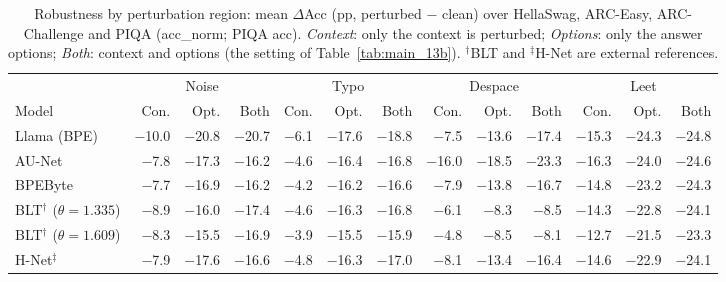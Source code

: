 \begin{table}[t]
\centering
\small
\caption{Robustness by perturbation region: mean $\Delta$Acc (pp, perturbed $-$ clean) over HellaSwag, ARC-Easy, ARC-Challenge and PIQA (acc\_norm; PIQA acc). \textit{Context}: only the context is perturbed; \textit{Options}: only the answer options; \textit{Both}: context and options (the setting of Table~\ref{tab:main_13b}). $^{\dagger}$BLT and $^{\ddagger}$H-Net are external references.}
\label{tab:robust_region}
\begin{tabular}{l|rrr|rrr|rrr|rrr}
\toprule
 & \multicolumn{3}{c}{Noise} & \multicolumn{3}{c}{Typo} & \multicolumn{3}{c}{Despace} & \multicolumn{3}{c}{Leet} \\
Model & Con. & Opt. & Both & Con. & Opt. & Both & Con. & Opt. & Both & Con. & Opt. & Both \\
\midrule
Llama (BPE) & $-$10.0 & $-$20.8 & $-$20.7 & $-$6.1 & $-$17.6 & $-$18.8 & $-$7.5 & $-$13.6 & $-$17.4 & $-$15.3 & $-$24.3 & $-$24.8 \\
AU-Net & $-$7.8 & $-$17.3 & $-$16.2 & $-$4.6 & $-$16.4 & $-$16.8 & $-$16.0 & $-$18.5 & $-$23.3 & $-$16.3 & $-$24.0 & $-$24.6 \\
BPEByte & $-$7.7 & $-$16.9 & $-$16.2 & $-$4.2 & $-$16.2 & $-$16.6 & $-$7.9 & $-$13.8 & $-$16.7 & $-$14.8 & $-$23.2 & $-$24.3 \\
\midrule
BLT$^{\dagger}$ ($\theta{=}1.335$) & $-$8.9 & $-$16.0 & $-$17.4 & $-$4.6 & $-$16.3 & $-$16.8 & $-$6.1 & $-$8.3 & $-$8.5 & $-$14.3 & $-$22.8 & $-$24.1 \\
BLT$^{\dagger}$ ($\theta{=}1.609$) & $-$8.3 & $-$15.5 & $-$16.9 & $-$3.9 & $-$15.5 & $-$15.9 & $-$4.8 & $-$8.5 & $-$8.1 & $-$12.7 & $-$21.5 & $-$23.3 \\
H-Net$^{\ddagger}$ & $-$7.9 & $-$17.6 & $-$16.6 & $-$4.8 & $-$16.3 & $-$17.0 & $-$8.1 & $-$13.4 & $-$16.4 & $-$14.6 & $-$22.9 & $-$24.1 \\
\bottomrule
\end{tabular}
\end{table}
